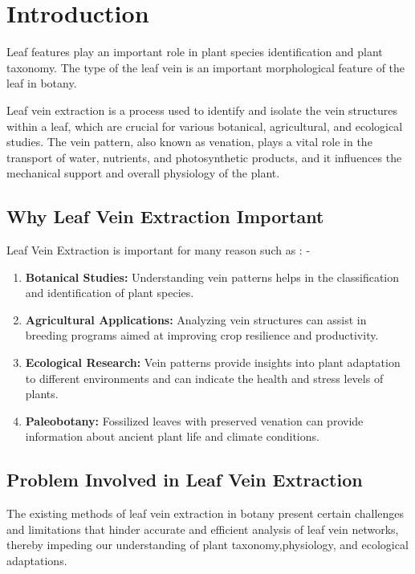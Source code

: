 \documentclass{report}
\begin{document}
\tableofcontents %
{\onehalfspacing
\chapter{Introduction}
Leaf features play an important role in plant species identification and plant taxonomy. The type of the leaf vein is an important morphological feature of the leaf in botany.

Leaf vein extraction is a process used to identify and isolate the vein structures within a leaf, which are crucial for various botanical, agricultural, and ecological studies. The vein pattern, also known as venation, plays a vital role in the transport of water, nutrients, and photosynthetic products, and it influences the mechanical support and overall physiology of the plant.
\section{Why Leaf Vein Extraction Important}
Leaf Vein Extraction is important for many reason such as : -
\begin{enumerate}[label=\arabic*.]
    \item \textbf{Botanical Studies:} Understanding vein patterns helps in the classification and identification of plant species.
    \item \textbf{Agricultural Applications:} Analyzing vein structures can assist in breeding programs aimed at improving crop resilience and productivity.
    \item \textbf{Ecological Research:} Vein patterns provide insights into plant adaptation to different environments and can indicate the health and stress levels of plants.
    \item \textbf{Paleobotany:} Fossilized leaves with preserved venation can provide information about ancient plant life and climate conditions.
\end{enumerate}
\section{Problem Involved in Leaf Vein Extraction}
The existing methods of leaf vein extraction in botany present certain challenges and limitations that hinder accurate and efficient analysis of leaf vein networks, thereby impeding our understanding of plant taxonomy,physiology, and ecological adaptations.

}
\end{document}
